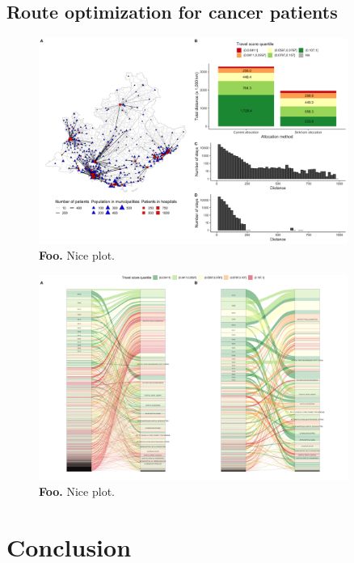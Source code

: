 \subsection{Route optimization for cancer patients}


\begin{figure}[h!]
    \includegraphics[width=0.9\textwidth]{images/routes/fig10.png}
    \centering
    \caption{ \textbf{Foo.} Nice plot. }
    \label{fig:sinkhorn-distribution}
\end{figure}

\begin{figure}[h!]
    \includegraphics[width=0.9\textwidth]{images/routes/fig11.png}
    \centering
    \caption{ \textbf{Foo.} Nice plot. }
    \label{fig:sinkhorn-alluvium}
\end{figure}

\section{Conclusion}

